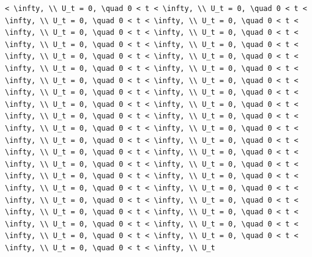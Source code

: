 \documentclass[
  ukrainian,
]{article}
\begin{document}
\begin{verbatim}
< \infty, \\ U_t = 0, \quad 0 < t < \infty, \\ U_t = 0, \quad 0 < t < \infty, \\ U_t = 0, \quad 0 < t < \infty, \\ U_t = 0, \quad 0 < t < \infty, \\ U_t = 0, \quad 0 < t < \infty, \\ U_t = 0, \quad 0 < t < \infty, \\ U_t = 0, \quad 0 < t < \infty, \\ U_t = 0, \quad 0 < t < \infty, \\ U_t = 0, \quad 0 < t < \infty, \\ U_t = 0, \quad 0 < t < \infty, \\ U_t = 0, \quad 0 < t < \infty, \\ U_t = 0, \quad 0 < t < \infty, \\ U_t = 0, \quad 0 < t < \infty, \\ U_t = 0, \quad 0 < t < \infty, \\ U_t = 0, \quad 0 < t < \infty, \\ U_t = 0, \quad 0 < t < \infty, \\ U_t = 0, \quad 0 < t < \infty, \\ U_t = 0, \quad 0 < t < \infty, \\ U_t = 0, \quad 0 < t < \infty, \\ U_t = 0, \quad 0 < t < \infty, \\ U_t = 0, \quad 0 < t < \infty, \\ U_t = 0, \quad 0 < t < \infty, \\ U_t = 0, \quad 0 < t < \infty, \\ U_t = 0, \quad 0 < t < \infty, \\ U_t = 0, \quad 0 < t < \infty, \\ U_t = 0, \quad 0 < t < \infty, \\ U_t = 0, \quad 0 < t < \infty, \\ U_t = 0, \quad 0 < t < \infty, \\ U_t = 0, \quad 0 < t < \infty, \\ U_t = 0, \quad 0 < t < \infty, \\ U_t = 0, \quad 0 < t < \infty, \\ U_t = 0, \quad 0 < t < \infty, \\ U_t = 0, \quad 0 < t < \infty, \\ U_t = 0, \quad 0 < t < \infty, \\ U_t = 0, \quad 0 < t < \infty, \\ U_t = 0, \quad 0 < t < \infty, \\ U_t = 0, \quad 0 < t < \infty, \\ U_t = 0, \quad 0 < t < \infty, \\ U_t = 0, \quad 0 < t < \infty, \\ U_t = 0, \quad 0 < t < \infty, \\ U_t = 0, \quad 0 < t < \infty, \\ U_t
\end{verbatim}
\end{document}
